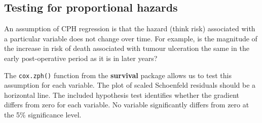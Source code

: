 \documentclass[
  12pt,
  krantz2]{krantz}
\begin{document}
\begin{table}[!h]

\caption{\label{tab:unnamed-chunk-15}Cox Proportional Hazards: Overall survival following surgery for melanoma with reduced model.}
\centering
{}
\end{table}

\hypertarget{testing-for-proportional-hazards}{%
\subsection{Testing for proportional hazards}\label{testing-for-proportional-hazards}}


An assumption of CPH regression is that the hazard (think risk) associated with a particular variable does not change over time.
For example, is the magnitude of the increase in risk of death associated with tumour ulceration the same in the early post-operative period as it is in later years?

The \texttt{cox.zph()} function from the \textbf{survival} package allows us to test this assumption for each variable.
The plot of scaled Schoenfeld residuals should be a horizontal line.
The included hypothesis test identifies whether the gradient differs from zero for each variable.
No variable significantly differs from zero at the 5\% significance level.
\end{document}
